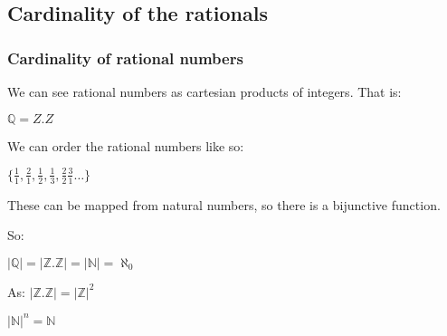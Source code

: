 \subsection{Cardinality of the rationals}

\subsubsection{Cardinality of rational numbers}

We can see rational numbers as cartesian products of integers. That is:

$\mathbb{Q}=Z.Z$

We can order the rational numbers like so:

$\{\frac{1}{1},\frac{2}{1},\frac{1}{2},\frac{1}{3},\frac{2}{2}\frac{3}{1}…\}$

These can be mapped from natural numbers, so there is a bijunctive function.

So:

\(|\mathbb{Q} |=|\mathbb{Z}.\mathbb{Z} |=|\mathbb{N} |=\aleph_0\)

As: \(|\mathbb{Z}.\mathbb{Z} |=|\mathbb{Z}|^2\)

$|\mathbb{N}|^n=\mathbb{N}$

